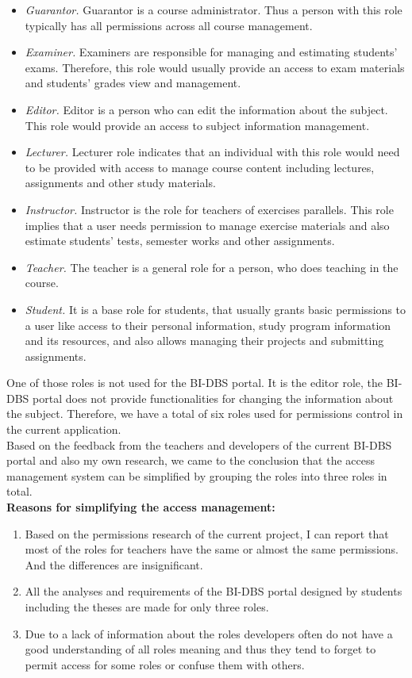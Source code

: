 \begin{itemize}
    \item \emph{Guarantor.} Guarantor is a course administrator. Thus a person with this role typically has all permissions across all course management.
    \item \emph{Examiner.} Examiners are responsible for managing and estimating students' exams. Therefore, this role would usually provide an access to exam materials and students' grades view and management.
    \item \emph{Editor.} Editor is a person who can edit the information about the subject. This role would provide an access to subject information management.
    \item \emph{Lecturer.} Lecturer role indicates that an individual with this role would need to be provided with access to manage course content including lectures, assignments and other study materials.
    \item \emph{Instructor.} Instructor is the role for teachers of exercises parallels. This role implies that a user needs permission to manage exercise materials and also estimate students' tests, semester works and other assignments.
    \item \emph{Teacher.} The teacher is a general role for a person, who does teaching in the course. 
    \item \emph{Student.} It is a base role for students, that usually grants basic permissions to a user like access to their personal information, study program information and its resources, and also allows managing their projects and submitting assignments.
\end{itemize}


\noindent One of those roles is not used for the BI-DBS portal. It is the editor role, the BI-DBS portal does not provide functionalities for changing the information about the subject. Therefore, we have a total of six roles used for permissions control in the current application.\\  
Based on the feedback from the teachers and developers of the current BI-DBS portal and also my own research, we came to the conclusion that the access management system can be simplified by grouping the roles into three roles in total.\\

\noindent \textbf{Reasons for simplifying the access management:}

\begin{enumerate}
    \item Based on the permissions research of the current project, I can report that most of the roles for teachers have the same or almost the same permissions. And the differences are insignificant.
    \item All the analyses and requirements of the BI-DBS portal designed by students including the theses are made for only three roles.
    \item Due to a lack of information about the roles developers often do not have a good understanding of all roles meaning and thus they tend to forget to permit access for some roles or confuse them with others.
\end{enumerate}

